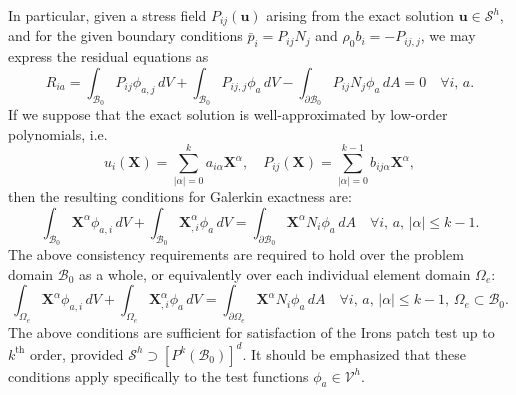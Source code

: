 In particular, given a stress field $P_{ij} (\mathbf{u})$ arising from the exact solution $\mathbf{u} \in \mathcal{S}^h$, and for the given boundary conditions $\bar{p}_i = P_{ij} N_j$ and $\rho_0 b_i = - P_{ij,j}$, we may express the residual equations as
\begin{equation}
	R_{ia} = \int_{\mathcal{B}_0} P_{ij} \phi_{a,j} \, dV + \int_{\mathcal{B}_0} P_{ij,j} \phi_a \, dV - \int_{\partial \mathcal{B}_0} P_{ij} N_j \phi_a \, dA = 0 \quad \forall i, \, a.
\end{equation}
If we suppose that the exact solution is well-approximated by low-order polynomials, i.e.
\begin{equation}
  u_{i} (\mathbf{X}) = \sum_{|\alpha| = 0}^{k} a_{i\alpha} \mathbf{X}^\alpha, \quad P_{ij} (\mathbf{X}) = \sum_{|\alpha| = 0}^{k-1} b_{ij\alpha} \mathbf{X}^\alpha,
\end{equation}
then the resulting conditions for Galerkin exactness are:
\begin{equation}
  \int_{\mathcal{B}_0} \mathbf{X}^{\alpha} \phi_{a,i} \, dV + \int_{\mathcal{B}_0} \mathbf{X}^{\alpha}_{,i} \phi_a \, dV = \int_{\partial \mathcal{B}_0} \mathbf{X}^{\alpha} N_i \phi_a \, dA \quad \forall i, \, a, \, | \alpha | \leq k-1.
\end{equation}
The above consistency requirements are required to hold over the problem domain $\mathcal{B}_0$ as a whole, or equivalently over each individual element domain $\Omega_e$:
\begin{equation}
  \int_{\Omega_e} \mathbf{X}^{\alpha} \phi_{a,i} \, dV + \int_{\Omega_e} \mathbf{X}^{\alpha}_{,i} \phi_a \, dV = \int_{\partial \Omega_e} \mathbf{X}^{\alpha} N_i \phi_a \, dA \quad \forall i, \, a, \, | \alpha | \leq k-1, \, \Omega_e \subset \mathcal{B}_0.
  \label{eq:consistency}
\end{equation}
The above conditions are sufficient for satisfaction of the Irons patch test up to $k^{\text{th}}$ order, provided $\mathcal{S}^h \supset [ P^{k} (\mathcal{B}_0) ]^d$. It should be emphasized that these conditions apply specifically to the test functions $\phi_a \in \mathcal{V}^h$.

